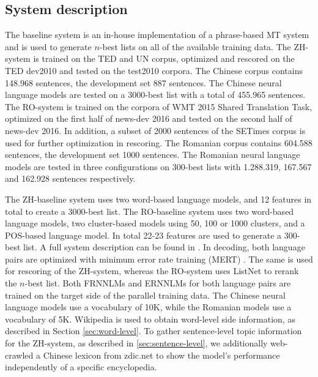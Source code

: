\documentclass[a4paper]{article}
\begin{document}
\subsection{System description}
The baseline system is an in-house implementation of a phrase-based MT system and is used to generate $n$-best lists on all of the available training data. The ZH-system is trained on the TED and UN corpus, optimized and rescored on the TED dev2010 and tested on the test2010 corpora. The Chinese corpus contains 148.968 sentences, the development set 887 sentences. The Chinese neural language models are tested on a $3000$-best list with a total of 455.965 sentences.
The RO-system is trained on the corpora of WMT 2015 Shared Translation Task, optimized on the first half of news-dev 2016 and tested on the second half of news-dev 2016. In addition, a subset of 2000 sentences of the SETimes corpus is used for further optimization in rescoring. The Romanian corpus contains 604.588 sentences, the development set 1000 sentences. The Romanian neural language models are tested in three configurations on $300$-best lists with 1.288.319, 167.567 and 162.928 sentences respectively.

The ZH-baseline system uses two word-based language models, and 12 features in total to create a $3000$-best list.
The RO-baseline system uses two word-based language models, two cluster-based models using 50, 100 or 1000 clusters, and a POS-based language model. In total 22-23 features are used to generate a $300$-best list. A full system description can be found in \cite{niehuesusing}.
In decoding, both language pairs are optimized with minimum error rate training (MERT) \cite{och2003minimum}. The same is used for rescoring of the ZH-system, whereas the RO-system uses ListNet to rerank the $n$-best list.
Both FRNNLMs and ERNNLMs for both language pairs are trained on the target side of the parallel training data. The Chinese neural language models use a vocabulary of 10K, while the Romanian models use a vocabulary of 5K. Wikipedia is used to obtain word-level side information, as described in Section \ref{sec:word-level}.
To gather sentence-level topic information for the ZH-system, as described in \ref{sec:sentence-level}, we additionally web-crawled a Chinese lexicon from zdic.net \cite{zdic} to show the model's performance independently of a specific encyclopedia.
\end{document}
